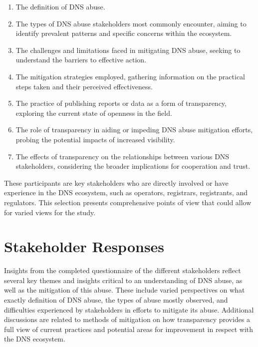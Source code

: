  \begin{enumerate}
 \item The definition of DNS abuse. 
  \item The types of DNS abuse stakeholders most commonly encounter, aiming to identify prevalent patterns and specific concerns within the ecosystem.
  
  \item The challenges and limitations faced in mitigating DNS abuse, seeking to understand the barriers to effective action.
  
  \item The mitigation strategies employed, gathering information on the practical steps taken and their perceived effectiveness.
  
  \item The practice of publishing reports or data as a form of transparency, exploring the current state of openness in the field.
  
  \item The role of transparency in aiding or impeding DNS abuse mitigation efforts, probing the potential impacts of increased visibility.
  
  \item  The effects of transparency on the relationships between various DNS stakeholders, considering the broader implications for cooperation and trust.
\end{enumerate}

 These participants are key stakeholders who are directly involved or have experience in the DNS ecosystem, such as operators, registrars, registrants, and regulators. This selection presents comprehensive points of view that could allow for varied views for the study.


\section{Stakeholder Responses} 

Insights from the completed questionnaire of the different stakeholders reflect several key themes and insights critical to an understanding of DNS abuse, as well as the mitigation of this abuse. These include varied perspectives on what exactly definition of DNS abuse, the types of abuse mostly observed, and difficulties experienced by stakeholders in efforts to mitigate its abuse. Additional discussions are related to methods of mitigation on how transparency provides a full view of current practices and potential areas for improvement in respect with the DNS ecosystem.

